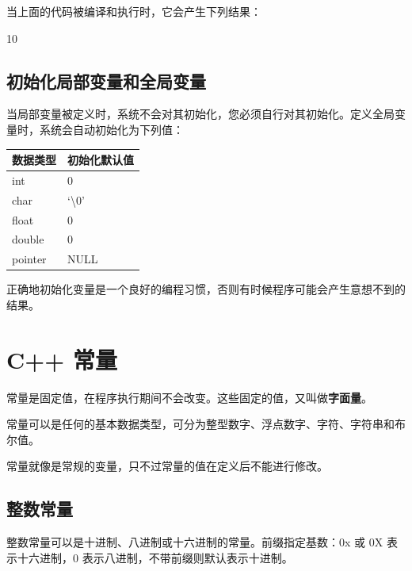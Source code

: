 \documentclass[
]{article}
\newenvironment{Shaded}{}{}
\newcommand{\DecValTok}[1]{\textcolor[rgb]{0.25,0.63,0.44}{#1}}
\begin{document}
当上面的代码被编译和执行时，它会产生下列结果：

\begin{Shaded}
\begin{Highlighting}[]
\DecValTok{10}
\end{Highlighting}
\end{Shaded}

\hypertarget{ux521dux59cbux5316ux5c40ux90e8ux53d8ux91cfux548cux5168ux5c40ux53d8ux91cf}{%
\subsection{初始化局部变量和全局变量}\label{ux521dux59cbux5316ux5c40ux90e8ux53d8ux91cfux548cux5168ux5c40ux53d8ux91cf}}

当局部变量被定义时，系统不会对其初始化，您必须自行对其初始化。定义全局变量时，系统会自动初始化为下列值：

\begin{longtable}[]{@{}ll@{}}
\toprule
数据类型 & 初始化默认值 \\
\midrule
\endhead
int & 0 \\
char & `\textbackslash0' \\
float & 0 \\
double & 0 \\
pointer & NULL \\
\bottomrule
\end{longtable}

正确地初始化变量是一个良好的编程习惯，否则有时候程序可能会产生意想不到的结果。

\hypertarget{c-ux5e38ux91cf}{%
\section{C++ 常量}\label{c-ux5e38ux91cf}}

常量是固定值，在程序执行期间不会改变。这些固定的值，又叫做\textbf{字面量}。

常量可以是任何的基本数据类型，可分为整型数字、浮点数字、字符、字符串和布尔值。

常量就像是常规的变量，只不过常量的值在定义后不能进行修改。

\hypertarget{ux6574ux6570ux5e38ux91cf}{%
\subsection{整数常量}\label{ux6574ux6570ux5e38ux91cf}}

整数常量可以是十进制、八进制或十六进制的常量。前缀指定基数：0x 或 0X
表示十六进制，0 表示八进制，不带前缀则默认表示十进制。
\end{document}

